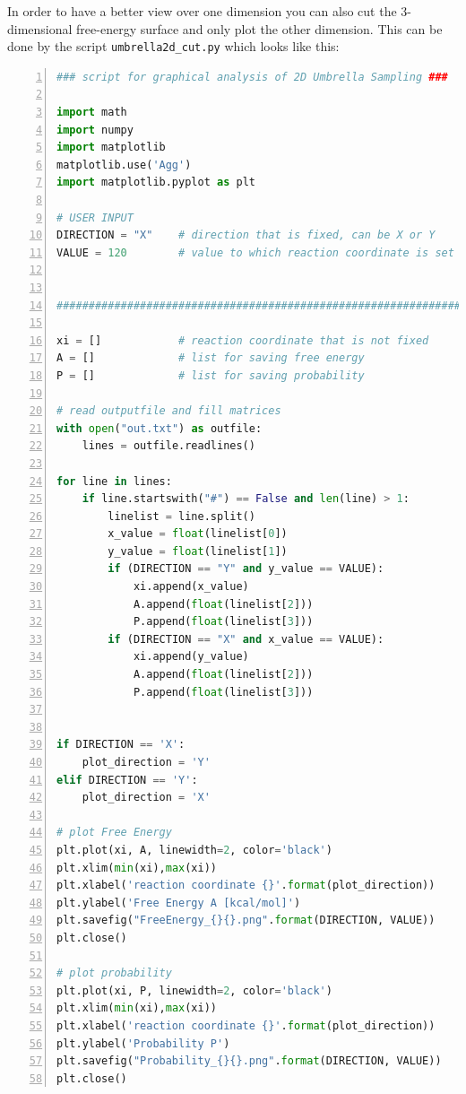 \documentclass[a4paper,11pt]{scrartcl}
\begin{document}
In order to have a better view over one dimension you can also cut the 3-dimensional free-energy surface and only plot the other dimension. This can be done by the script \texttt{umbrella2d\_cut.py} which looks like this:
\begin{lstlisting}[frame=single,language=python,basicstyle=\footnotesize,commentstyle=\color{red},keywordstyle=\color{blue},stringstyle=\color{mygreen},numbers=left]
### script for graphical analysis of 2D Umbrella Sampling ###

import math
import numpy
import matplotlib
matplotlib.use('Agg')
import matplotlib.pyplot as plt

# USER INPUT
DIRECTION = "X"    # direction that is fixed, can be X or Y
VALUE = 120        # value to which reaction coordinate is set


######################################################################

xi = []            # reaction coordinate that is not fixed
A = []             # list for saving free energy
P = []             # list for saving probability

# read outputfile and fill matrices
with open("out.txt") as outfile:
    lines = outfile.readlines()

for line in lines:
    if line.startswith("#") == False and len(line) > 1:
        linelist = line.split()
        x_value = float(linelist[0])
        y_value = float(linelist[1])
        if (DIRECTION == "Y" and y_value == VALUE):
            xi.append(x_value)
            A.append(float(linelist[2]))
            P.append(float(linelist[3]))
        if (DIRECTION == "X" and x_value == VALUE):
            xi.append(y_value)
            A.append(float(linelist[2]))
            P.append(float(linelist[3]))
            

if DIRECTION == 'X':
    plot_direction = 'Y'
elif DIRECTION == 'Y':
    plot_direction = 'X'

# plot Free Energy
plt.plot(xi, A, linewidth=2, color='black')
plt.xlim(min(xi),max(xi))
plt.xlabel('reaction coordinate {}'.format(plot_direction))
plt.ylabel('Free Energy A [kcal/mol]')
plt.savefig("FreeEnergy_{}{}.png".format(DIRECTION, VALUE))
plt.close()

# plot probability
plt.plot(xi, P, linewidth=2, color='black')
plt.xlim(min(xi),max(xi))
plt.xlabel('reaction coordinate {}'.format(plot_direction))
plt.ylabel('Probability P')
plt.savefig("Probability_{}{}.png".format(DIRECTION, VALUE))
plt.close()
\end{lstlisting}
\end{document}
